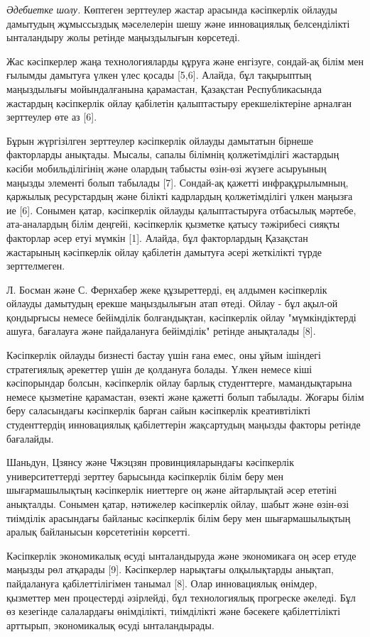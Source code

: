 \begin{multicols}{2}
\emph{Әдебиетке шолу.} Көптеген зерттеулер жастар арасында кәсіпкерлік
ойлауды дамытудың жұмыссыздық мәселелерін шешу және инновациялық
белсенділікті ынталандыру жолы ретінде маңыздылығын көрсетеді.

Жас кәсіпкерлер жаңа технологияларды құруға және енгізуге, сондай-ақ
білім мен ғылымды дамытуға үлкен үлес қосады {[}5,6{]}. Алайда, бұл
тақырыптың маңыздылығы мойындалғанына қарамастан, Қазақстан
Республикасында жастардың кәсіпкерлік ойлау қабілетін қалыптастыру
ерекшеліктеріне арналған зерттеулер өте аз {[}6{]}.

Бұрын жүргізілген зерттеулер кәсіпкерлік ойлауды дамытатын бірнеше
факторларды анықтады. Мысалы, сапалы білімнің қолжетімділігі жастардың
кәсіби мобильділігінің және олардың табысты өзін-өзі жүзеге асыруының
маңызды элементі болып табылады {[}7{]}. Сондай-ақ қажетті
инфрақұрылымның, қаржылық ресурстардың және білікті кадрлардың
қолжетімділігі үлкен маңызға ие {[}6{]}. Сонымен қатар, кәсіпкерлік
ойлауды қалыптастыруға отбасылық мәртебе, ата-аналардың білім деңгейі,
кәсіпкерлік қызметке қатысу тәжірибесі сияқты факторлар әсер етуі мүмкін
{[}1{]}. Алайда, бұл факторлардың Қазақстан жастарының кәсіпкерлік ойлау
қабілетін дамытуға әсері жеткілікті түрде зерттелмеген.

Л. Босман және С. Фернхабер жеке құзыреттерді, ең алдымен кәсіпкерлік
ойлауды дамытудың ерекше маңыздылығын атап өтеді. Ойлау - бұл ақыл-ой
қондырғысы немесе бейімділік болғандықтан, кәсіпкерлік ойлау
"мүмкіндіктерді ашуға, бағалауға және пайдалануға бейімділік" ретінде
анықталады {[}8{]}.

Кәсіпкерлік ойлауды бизнесті бастау үшін ғана емес, оны ұйым ішіндегі
стратегиялық әрекеттер үшін де қолдануға болады. Үлкен немесе кіші
кәсіпорындар болсын, кәсіпкерлік ойлау барлық студенттерге,
мамандықтарына немесе қызметіне қарамастан, өзекті және қажетті болып
табылады. Жоғары білім беру саласындағы кәсіпкерлік барған сайын
кәсіпкерлік креативтілікті студенттердің инновациялық қабілеттерін
жақсартудың маңызды факторы ретінде бағалайды.

Шаньдун, Цзянсу және Чжэцзян провинцияларындағы кәсіпкерлік
университеттерді зерттеу барысында кәсіпкерлік білім беру мен
шығармашылықтың кәсіпкерлік ниеттерге оң және айтарлықтай әсер ететіні
анықталды. Сонымен қатар, нәтижелер кәсіпкерлік ойлау, шабыт және
өзін-өзі тиімділік арасындағы байланыс кәсіпкерлік білім беру мен
шығармашылықтың аралық байланысын көрсететінін көрсетті.

Кәсіпкерлік экономикалық өсуді ынталандыруда және экономикаға оң әсер
етуде маңызды рөл атқарады {[}9{]}. Кәсіпкерлер нарықтағы олқылықтарды
анықтап, пайдалануға қабілеттілігімен танымал {[}8{]}. Олар инновациялық
өнімдер, қызметтер мен процестерді әзірлейді, бұл технологиялық
прогреске әкеледі. Бұл өз кезегінде салалардағы өнімділікті, тиімділікті
және бәсекеге қабілеттілікті арттырып, экономикалық өсуді ынталандырады.


\end{multicols}
